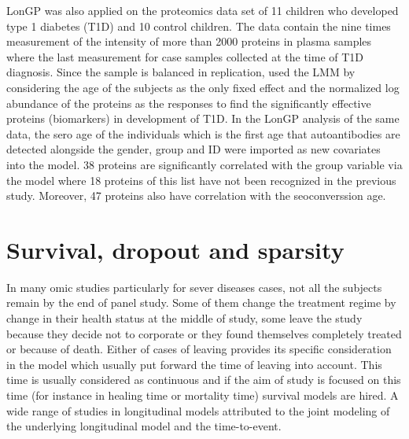 \documentclass[]{article}
\begin{document}
		LonGP was also applied on the proteomics data set of 11 children who developed type 1 diabetes (T1D) and 10 control children. The data contain the nine times measurement of the  intensity of more than 2000 proteins in plasma samples where the last measurement for case samples collected at the time of T1D diagnosis. Since the sample is balanced in replication, \cite{Liu2018} used the LMM by considering the age of the subjects as the only fixed effect and the normalized log abundance of the proteins as the responses to find the significantly effective proteins (biomarkers) in development of T1D. In the LonGP analysis of the same data, the sero age of the individuals which is the first age that autoantibodies are detected alongside the gender, group and ID were imported as new covariates into the model. 38 proteins are significantly correlated with the group variable via the model where 18 proteins of this list have not been recognized in the previous study. Moreover, 47 proteins also have correlation with the seoconverssion age. 
		
		
		
		
		\section{Survival, dropout and sparsity}
		In many omic studies particularly for sever diseases cases, not all the subjects remain by the end of panel study. Some of them change the treatment regime by change in their health status at the middle of study, some leave the study because they decide not to corporate or they found themselves completely treated or because of death. Either of cases of leaving provides its specific consideration in the model which usually put forward the time of leaving into account. This time is usually considered as continuous and if the aim of study is focused on this time (for instance in healing time or mortality time) survival models are hired. A wide range of studies in longitudinal models attributed to the joint modeling of the underlying longitudinal model and the time-to-event. 
\end{document}
